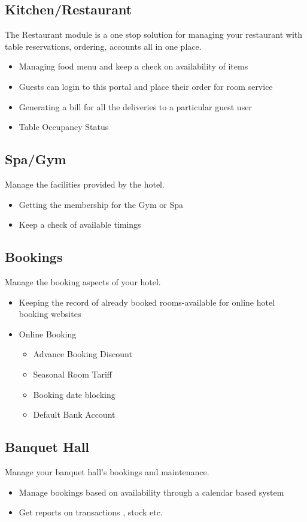 \documentclass{scrreprt}
\begin{document}
\subsection{Kitchen/Restaurant}
The Restaurant module is a one stop solution for managing your restaurant with table reservations, ordering, accounts all in one place.
\begin{itemize}
    \item Managing food menu and keep a check on availability of  items
    \item Guests can login to this portal and place their order for room service
    \item Generating a bill for all the deliveries to a particular guest user
    \item Table Occupancy Status
\end{itemize}

\subsection{Spa/Gym}
Manage the facilities provided by the hotel.
\begin{itemize}
    \item Getting the membership for the Gym or Spa
    \item Keep a check of available timings
\end{itemize}

\subsection{Bookings}
Manage the booking aspects of your hotel.
\begin{itemize}
    \item Keeping the record of already booked rooms-available for online hotel booking websites
    \item Online Booking
\begin{itemize}
    \item Advance Booking Discount
    \item Seasonal Room Tariff
    \item Booking date blocking
    \item Default Bank Account 
\end{itemize}
\end{itemize}

\subsection{Banquet Hall}
Manage your banquet hall's bookings and maintenance.
\begin{itemize}
\item Manage bookings based on availability through a calendar based system
\item Get reports on transactions , stock etc.
\end{itemize}
\end{document}
